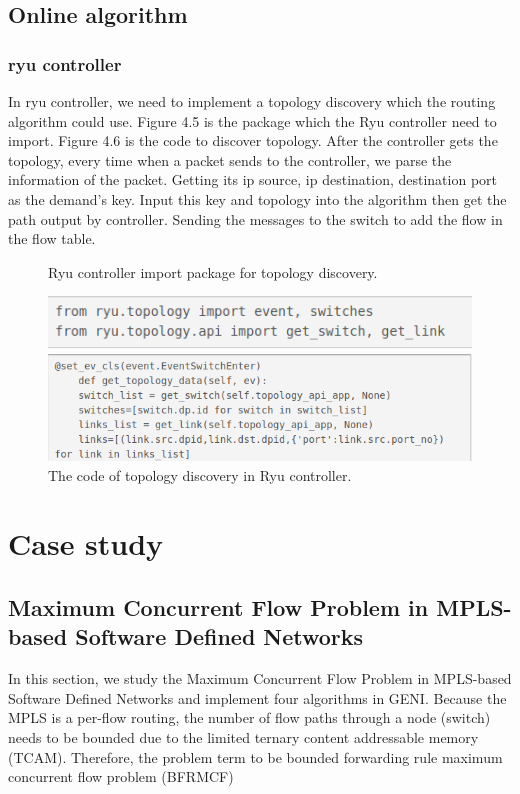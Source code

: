 \documentclass[a4paper,12pt]{report}
\begin{document}
\begin{CJK*}{UTF8}{bkai}
\begin{large}
	 	\section{Online algorithm}
	 		\subsection{ryu controller}
	 		\qquad In ryu controller, we need to implement a topology discovery which the routing algorithm could use. Figure 4.5 is the package which the Ryu controller need to import. Figure 4.6 is the code to discover topology. After the controller gets the topology, every time when a packet sends to the controller, we parse the information of the packet. Getting its ip source, ip destination, destination port as the demand's key. Input this key and topology into the algorithm then get the path output by controller. Sending the messages to the switch to add the flow in the flow table.
	 		\begin{figure}
	          \caption{Ryu controller import package for topology discovery.}
	          \centering
	            \includegraphics[width=1.0\textwidth]{ryu_import.png}
	          \caption{The code of topology discovery in Ryu controller.}
	            \includegraphics[width=1.0\textwidth]{ryu_discovery.png}
	      	\end{figure}
  \chapter{Case study}
  \section{Maximum Concurrent Flow Problem in MPLS-based Software Defined Networks}
    \qquad In this section, we study the Maximum Concurrent Flow Problem in MPLS-based Software Defined Networks and implement four algorithms in GENI. Because the MPLS is a per-flow routing, the number of flow paths through a node (switch) needs to be bounded due to the limited ternary content addressable memory (TCAM). Therefore, the problem term to be bounded forwarding rule maximum concurrent flow problem (BFRMCF)

\end{large}
\end{CJK*}
\end{document}
